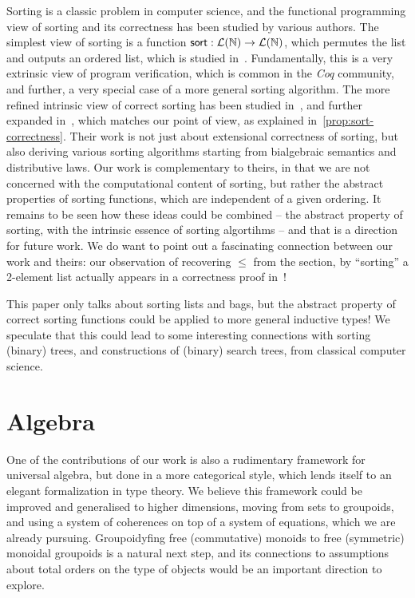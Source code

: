 Sorting is a classic problem in computer science, and the functional programming view of sorting and its correctness has
been studied by various authors.
%
The simplest view of sorting is a function $\operatorname{\mathsf{sort}}: \mathcal{L}(\mathbb{N}) \to \mathcal{L}(\mathbb{N})$,
which permutes the list and outputs an ordered list, which is studied in~\cite{appelVerifiedFunctionalAlgorithms2023}.
%
Fundamentally, this is a very extrinsic view of program verification, which is common in the \emph{Coq} community,
and further, a very special case of a more general sorting algorithm.
%
The more refined intrinsic view of correct sorting has been studied in~\cite{hinzeSortingBialgebrasDistributive2012},
and further expanded in~\cite{alexandruIntrinsicallyCorrectSorting2023}, which matches our point of view, as explained
in~\cref{prop:sort-correctness}.
%
Their work is not just about extensional correctness of sorting, but also deriving various sorting algorithms
starting from bialgebraic semantics and distributive laws.
%
Our work is complementary to theirs, in that we are not concerned with the computational content of sorting, but rather
the abstract properties of sorting functions, which are independent of a given ordering.
%
It remains to be seen how these ideas could be combined -- the abstract property of sorting, with the intrinsic essence
of sorting algortihms -- and that is a direction for future work.
%
We do want to point out a fascinating connection between our work and theirs: our observation of recovering $\leq$ from
the section, by ``sorting'' a 2-element list actually appears in a correctness proof
in~\cite[Section~4.6,pg.324]{hengleinSortingSearchingDistribution2013}!

This paper only talks about sorting lists and bags, but the abstract property of correct sorting functions could be
applied to more general inductive types! We speculate that this could lead to some interesting connections with sorting
(binary) trees, and constructions of (binary) search trees, from classical computer science.

\section{Algebra}

One of the contributions of our work is also a rudimentary framework for universal algebra, but done in a more
categorical style, which lends itself to an elegant formalization in type theory.
%
We believe this framework could be improved and generalised to higher dimensions, moving from sets to groupoids,
and using a system of coherences on top of a system of equations, which we are already pursuing.
%
Groupoidyfing free (commutative) monoids to free (symmetric) monoidal groupoids is a natural next step, and its
connections to assumptions about total orders on the type of objects would be an important direction to explore.


